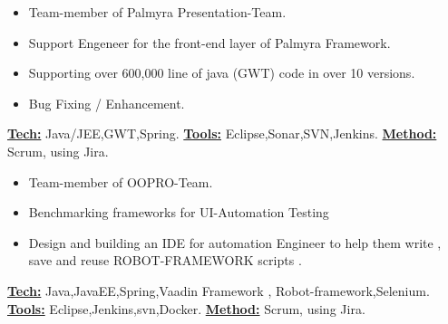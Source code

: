 \documentclass[10pt,a4paper]{altacv}
\begin{document}
\begin{itemize}
\item Team-member of Palmyra Presentation-Team.
\item Support Engeneer for the front-end layer of Palmyra Framework.
\item Supporting over 600,000 line of java (GWT) code in over 10 versions.
\item Bug Fixing / Enhancement.
\end{itemize}
\underline{\textbf{Tech:}} Java/JEE,GWT,Spring.
\newline
\underline{\textbf{Tools:}} Eclipse,Sonar,SVN,Jenkins.
\newline
\underline{\textbf{Method:}} Scrum, using Jira.
\divider


\begin{itemize}
\item Team-member of OOPRO-Team.

\item Benchmarking frameworks for UI-Automation Testing 
\item Design and building an IDE for automation Engineer to help them write , save and reuse ROBOT-FRAMEWORK scripts  .
\end{itemize}
\underline{\textbf{Tech:}} Java,JavaEE,Spring,Vaadin Framework , Robot-framework,Selenium.
\newline
\underline{\textbf{Tools:}} Eclipse,Jenkins,svn,Docker. 
\newline
\underline{\textbf{Method:}} Scrum, using Jira.




\end{document}
